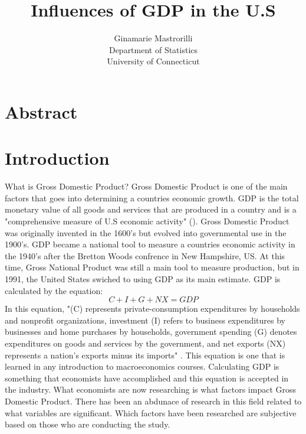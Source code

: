 \documentclass[12pt]{article}
\title{Influences of GDP in the U.S }
\author{Ginamarie Mastrorilli\\
  Department of Statistics\\
  University of Connecticut
}
\begin{document}
\maketitle


\section*{Abstract}



\section*{Introduction}
What is Gross Domestic Product? Gross Domestic Product is one of the main factors that goes into determining a countries economic growth. 
GDP is the total monetary value of all goods and services that are produced in a country and is a "comprehensive measure of U.S economic activity" (\citet[]{bea}).
Gross Domestic Product was originally invented in the 1600's but evolved into governmental use in the 1900's. 
GDP became a national tool to measure a countries economic activity in the 1940's after the Bretton Woods confrence in New Hampshire, US.
At this time, Gross National Product was still a main tool to measure production, but in 1991, the United States swiched to using GDP as its main estimate. 
GDP is calculated by the equation: 
\begin{equation}
C + I + G + NX = GDP
\end{equation}
In this equation, "(C) represents private-consumption expenditures by households and nonprofit organizations, investment (I) refers to business expenditures by businesses and home purchases by households, 
government spending (G) denotes expenditures on goods and services by the government, and net exports (NX) represents a nation’s exports minus its imports" \citet[]{brit}.
This equation is one that is learned in any introduction to macroeconomics courses. 
Calculating GDP is something that economists have accomplished and this equation is accepted in the industry. 
What economists are now researching is what factors impact Gross Domestic Product. 
There has been an abdunace of research in this field related to what variables are significant. 
Which factors have been researched are subjective based on those who are conducting the study.
\end{document}
